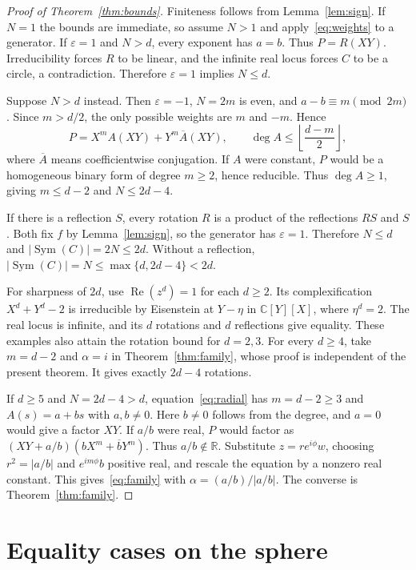 \documentclass[11pt,a4paper]{article}
\theoremstyle{definition}
\newcommand{\C}{\mathbb{C}}
\newcommand{\R}{\mathbb{R}}
\DeclareMathOperator{\Sym}{Sym}
\DeclareMathOperator{\Rea}{Re}
\begin{document}
\begin{proof}[Proof of Theorem~\ref{thm:bounds}]
Finiteness follows from Lemma~\ref{lem:sign}. If $N=1$ the bounds are
immediate, so assume $N>1$ and apply~\eqref{eq:weights} to a generator.
If $\varepsilon=1$ and $N>d$, every exponent has $a=b$.
Thus $P=R(XY)$. Irreducibility forces $R$ to be linear, and the infinite
real locus forces $C$ to be a circle, a contradiction. Therefore
$\varepsilon=1$ implies $N\le d$.

Suppose $N>d$ instead. Then $\varepsilon=-1$, $N=2m$ is even, and
$a-b\equiv m\pmod{2m}$. Since $m>d/2$, the only possible weights are
$m$ and $-m$. Hence
\begin{equation}\label{eq:radial}
 P=X^m A(XY)+Y^m\overline A(XY),\qquad
 \deg A\le\left\lfloor\frac{d-m}{2}\right\rfloor,
\end{equation}
where $\overline A$ means coefficientwise conjugation.
If $A$ were constant, $P$ would be a homogeneous binary form of degree
$m\ge2$, hence reducible. Thus $\deg A\ge1$, giving
$m\le d-2$ and $N\le2d-4$.

If there is a reflection $S$, every rotation $R$ is a product of the
reflections $RS$ and $S$. Both fix $f$ by Lemma~\ref{lem:sign}, so
the generator has $\varepsilon=1$. Therefore $N\le d$ and
$|\Sym(C)|=2N\le2d$. Without a reflection,
$|\Sym(C)|=N\le\max\{d,2d-4\}<2d$.

For sharpness of $2d$, use $\Rea(z^d)=1$ for each $d\ge2$.
Its complexification $X^d+Y^d-2$ is irreducible by Eisenstein at
$Y-\eta$ in $\C[Y][X]$, where $\eta^d=2$. The real locus is infinite,
and its $d$ rotations and $d$ reflections give equality.
These examples also attain the rotation bound for $d=2,3$.
For every $d\ge4$, take $m=d-2$ and $\alpha=i$ in
Theorem~\ref{thm:family}, whose proof is independent of the present
theorem. It gives exactly $2d-4$ rotations.

If $d\ge5$ and $N=2d-4>d$, equation~\eqref{eq:radial}
has $m=d-2\ge3$ and $A(s)=a+bs$ with $a,b\ne0$.
Here $b\ne0$ follows from the degree, and $a=0$ would give a factor
$XY$. If $a/b$ were real, $P$ would factor as
$(XY+a/b)(bX^m+\overline bY^m)$.
Thus $a/b\notin\R$. Substitute $z=r e^{i\phi}w$, choosing
$r^2=|a/b|$ and $e^{im\phi}b$ positive real, and rescale the equation
by a nonzero real constant. This gives~\eqref{eq:family} with
$\alpha=(a/b)/|a/b|$. The converse is Theorem~\ref{thm:family}.
\end{proof}

\section{Equality cases on the sphere}
\end{document}
